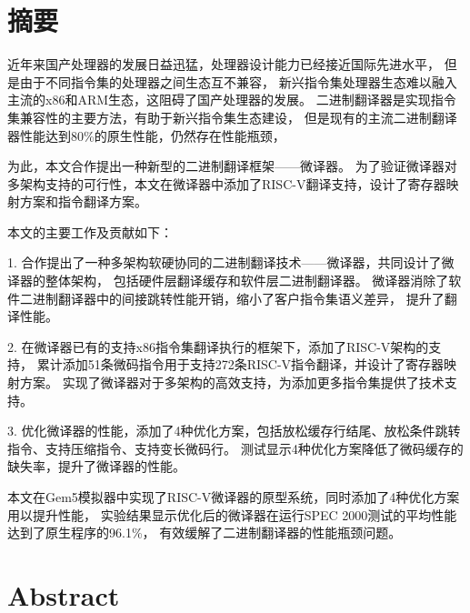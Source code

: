 \maketitle%
\MAKETITLE%
\makedeclaration%
\intobmk\chapter*{摘\quad 要}%
\setcounter{page}{1}%

近年来国产处理器的发展日益迅猛，处理器设计能力已经接近国际先进水平，
但是由于不同指令集的处理器之间生态互不兼容，
新兴指令集处理器生态难以融入主流的x86和ARM生态，这阻碍了国产处理器的发展。
二进制翻译器是实现指令集兼容性的主要方法，有助于新兴指令集生态建设，
但是现有的主流二进制翻译器性能达到80\%的原生性能，仍然存在性能瓶颈，

为此，本文合作提出一种新型的二进制翻译框架——微译器。
为了验证微译器对多架构支持的可行性，本文在微译器中添加了RISC-V翻译支持，设计了寄存器映射方案和指令翻译方案。

本文的主要工作及贡献如下：

1. 合作提出了一种多架构软硬协同的二进制翻译技术——微译器，共同设计了微译器的整体架构，
包括硬件层翻译缓存和软件层二进制翻译器。
微译器消除了软件二进制翻译器中的间接跳转性能开销，缩小了客户指令集语义差异，
提升了翻译性能。

2. 在微译器已有的支持x86指令集翻译执行的框架下，添加了RISC-V架构的支持，
累计添加51条微码指令用于支持272条RISC-V指令翻译，并设计了寄存器映射方案。
实现了微译器对于多架构的高效支持，为添加更多指令集提供了技术支持。

3. 优化微译器的性能，添加了4种优化方案，包括放松缓存行结尾、放松条件跳转指令、支持压缩指令、支持变长微码行。
测试显示4种优化方案降低了微码缓存的缺失率，提升了微译器的性能。

本文在Gem5模拟器中实现了RISC-V微译器的原型系统，同时添加了4种优化方案用以提升性能，
实验结果显示优化后的微译器在运行SPEC 2000测试的平均性能达到了原生程序的96.1\%，
有效缓解了二进制翻译器的性能瓶颈问题。

\intobmk\chapter*{Abstract}%

